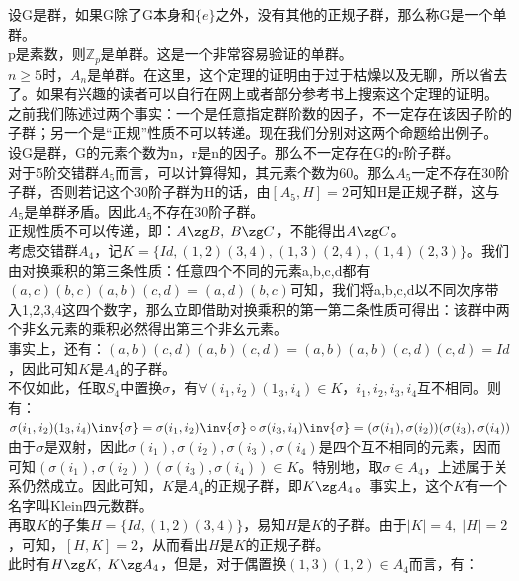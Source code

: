 设G是群，如果G除了G本身和$\{e\}$之外，没有其他的正规子群，那么称G是一个单群。\\
p是素数，则$\mathbb{Z}_p$是单群。这是一个非常容易验证的单群。\\
$n\geq 5$时，$A_n$是单群。在这里，这个定理的证明由于过于枯燥以及无聊，所以省去了。如果有兴趣的读者可以自行在网上或者部分参考书上搜索这个定理的证明。\\
\indent 之前我们陈述过两个事实：一个是任意指定群阶数的因子，不一定存在该因子阶的子群；另一个是“正规”性质不可以转递。现在我们分别对这两个命题给出例子。\\
设G是群，G的元素个数为n，r是n的因子。那么不一定存在G的r阶子群。\\
对于5阶交错群$A_5$而言，可以计算得知，其元素个数为60。那么$A_5$一定不存在30阶子群，否则若记这个30阶子群为H的话，由$[A_5,H]=2$可知H是正规子群，这与$A_5$是单群矛盾。因此$A_5$不存在30阶子群。\\
正规性质不可以传递，即：$A\zg B,\; B\zg C$，不能得出$A\zg C$。\\
考虑交错群$A_4$，记$K=\{Id,(1,2)(3,4),(1,3)(2,4),(1,4)(2,3)\}$。我们由对换乘积的第三条性质：任意四个不同的元素a,b,c,d都有$(a,c)(b,c)(a,b)(c,d)=(a,d)(b,c)$可知，我们将a,b,c,d以不同次序带入1,2,3,4这四个数字，那么立即借助对换乘积的第一第二条性质可得出：该群中两个非幺元素的乘积必然得出第三个非幺元素。\\
事实上，还有：$(a,b)(c,d)(a,b)(c,d)=(a,b)(a,b)(c,d)(c,d)=Id$，因此可知$K$是$A_4$的子群。\\
不仅如此，任取$S_4$中置换$\sigma$，有$\forall (i_1,i_2)(1_3,i_4)\in K$，$i_1,i_2,i_3,i_4$互不相同。则有：$\sigma(i_1,i_2)(1_3,i_4)\inv{\sigma}=\sigma(i_1,i_2)\inv{\sigma}\circ\sigma(i_3,i_4)\inv{\sigma}=(\sigma(i_1),\sigma(i_2))(\sigma(i_3),\sigma(i_4))$\\
由于$\sigma$是双射，因此$\sigma(i_1),\sigma(i_2),\sigma(i_3),\sigma(i_4)$是四个互不相同的元素，因而可知$(\sigma(i_1),\sigma(i_2))(\sigma(i_3),\sigma(i_4))\in K$。特别地，取$\sigma\in A_4$，上述属于关系仍然成立。因此可知，$K$是$A_4$的正规子群，即$K\zg A_4$。事实上，这个$K$有一个名字叫Klein四元数群。\\
再取$K$的子集$H=\{Id,(1,2)(3,4)\}$，易知$H$是$K$的子群。由于$|K|=4,\;|H|=2$，可知，$[H,K]=2$，从而看出$H$是$K$的正规子群。\\
此时有$H\zg K,\; K\zg A_4$，但是，对于偶置换$(1,3)(1,2)\in A_4$而言，有：
